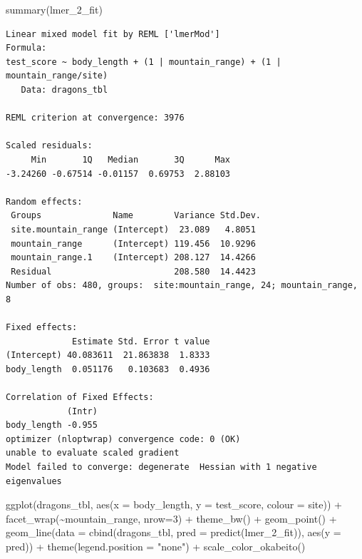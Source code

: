 \documentclass[
  letterpaper,
  DIV=11,
  oneside]{scrreport}
\newenvironment{Shaded}{\begin{snugshade}}{\end{snugshade}}
\newcommand{\AttributeTok}[1]{\textcolor[rgb]{0.40,0.45,0.13}{#1}}
\newcommand{\DecValTok}[1]{\textcolor[rgb]{0.68,0.00,0.00}{#1}}
\newcommand{\FunctionTok}[1]{\textcolor[rgb]{0.28,0.35,0.67}{#1}}
\newcommand{\NormalTok}[1]{\textcolor[rgb]{0.00,0.23,0.31}{#1}}
\newcommand{\SpecialCharTok}[1]{\textcolor[rgb]{0.37,0.37,0.37}{#1}}
\newcommand{\StringTok}[1]{\textcolor[rgb]{0.13,0.47,0.30}{#1}}
\begin{document}
\begin{Shaded}
\begin{Highlighting}[]
\FunctionTok{summary}\NormalTok{(lmer\_2\_fit)}
\end{Highlighting}
\end{Shaded}

\begin{verbatim}
Linear mixed model fit by REML ['lmerMod']
Formula: 
test_score ~ body_length + (1 | mountain_range) + (1 | mountain_range/site)
   Data: dragons_tbl

REML criterion at convergence: 3976

Scaled residuals: 
     Min       1Q   Median       3Q      Max 
-3.24260 -0.67514 -0.01157  0.69753  2.88103 

Random effects:
 Groups              Name        Variance Std.Dev.
 site.mountain_range (Intercept)  23.089   4.8051 
 mountain_range      (Intercept) 119.456  10.9296 
 mountain_range.1    (Intercept) 208.127  14.4266 
 Residual                        208.580  14.4423 
Number of obs: 480, groups:  site:mountain_range, 24; mountain_range, 8

Fixed effects:
             Estimate Std. Error t value
(Intercept) 40.083611  21.863838  1.8333
body_length  0.051176   0.103683  0.4936

Correlation of Fixed Effects:
            (Intr)
body_length -0.955
optimizer (nloptwrap) convergence code: 0 (OK)
unable to evaluate scaled gradient
Model failed to converge: degenerate  Hessian with 1 negative eigenvalues
\end{verbatim}

\begin{Shaded}
\begin{Highlighting}[]
\FunctionTok{ggplot}\NormalTok{(dragons\_tbl, }\FunctionTok{aes}\NormalTok{(}\AttributeTok{x =}\NormalTok{ body\_length, }\AttributeTok{y =}\NormalTok{ test\_score, }\AttributeTok{colour =}\NormalTok{ site)) }\SpecialCharTok{+}
  \FunctionTok{facet\_wrap}\NormalTok{(}\SpecialCharTok{\textasciitilde{}}\NormalTok{mountain\_range, }\AttributeTok{nrow=}\DecValTok{3}\NormalTok{) }\SpecialCharTok{+}
  \FunctionTok{theme\_bw}\NormalTok{() }\SpecialCharTok{+}
  \FunctionTok{geom\_point}\NormalTok{() }\SpecialCharTok{+}
  \FunctionTok{geom\_line}\NormalTok{(}\AttributeTok{data =} \FunctionTok{cbind}\NormalTok{(dragons\_tbl, }\AttributeTok{pred =} \FunctionTok{predict}\NormalTok{(lmer\_2\_fit)), }\FunctionTok{aes}\NormalTok{(}\AttributeTok{y =}\NormalTok{ pred)) }\SpecialCharTok{+}
  \FunctionTok{theme}\NormalTok{(}\AttributeTok{legend.position =} \StringTok{"none"}\NormalTok{) }\SpecialCharTok{+}
  \FunctionTok{scale\_color\_okabeito}\NormalTok{() }
\end{Highlighting}
\end{Shaded}
\end{document}
